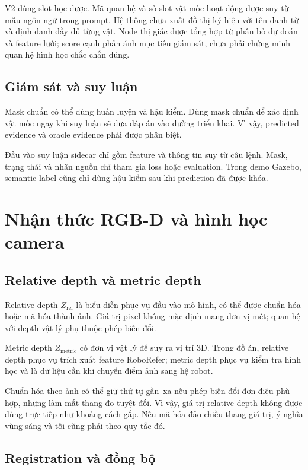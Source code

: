 V2 dùng slot học được. Mã quan hệ và số slot vật mốc hoạt động được suy từ mẫu ngôn ngữ trong prompt. Hệ thống chưa xuất đồ thị ký hiệu với tên danh từ và định danh đầy đủ từng vật. Node thị giác được tổng hợp từ phân bố dự đoán và feature lưới; score cạnh phản ánh mục tiêu giám sát, chưa phải chứng minh quan hệ hình học chắc chắn đúng.

\subsection{Giám sát và suy luận}

Mask chuẩn có thể dùng huấn luyện và hậu kiểm. Dùng mask chuẩn để xác định vật mốc ngay khi suy luận sẽ đưa đáp án vào đường triển khai. Vì vậy, predicted evidence và oracle evidence phải được phân biệt.

Đầu vào suy luận sidecar chỉ gồm feature và thông tin suy từ câu lệnh. Mask, trạng thái và nhãn nguồn chỉ tham gia loss hoặc evaluation. Trong demo Gazebo, semantic label cũng chỉ dùng hậu kiểm sau khi prediction đã được khóa.

\section{Nhận thức RGB-D và hình học camera}
\label{sec:theory-rgbd}

\subsection{Relative depth và metric depth}

Relative depth $Z_{\mathrm{rel}}$ là biểu diễn phục vụ đầu vào mô hình, có thể được chuẩn hóa hoặc mã hóa thành ảnh. Giá trị pixel không mặc định mang đơn vị mét; quan hệ với depth vật lý phụ thuộc phép biến đổi.

Metric depth $Z_{\mathrm{metric}}$ có đơn vị vật lý để suy ra vị trí 3D. Trong đồ án, relative depth phục vụ trích xuất feature RoboRefer; metric depth phục vụ kiểm tra hình học và là dữ liệu cần khi chuyển điểm ảnh sang hệ robot.

Chuẩn hóa theo ảnh có thể giữ thứ tự gần--xa nếu phép biến đổi đơn điệu phù hợp, nhưng làm mất thang đo tuyệt đối. Vì vậy, giá trị relative depth không được dùng trực tiếp như khoảng cách gắp. Nếu mã hóa đảo chiều thang giá trị, ý nghĩa vùng sáng và tối cũng phải theo quy tắc đó.

\subsection{Registration và đồng bộ}


